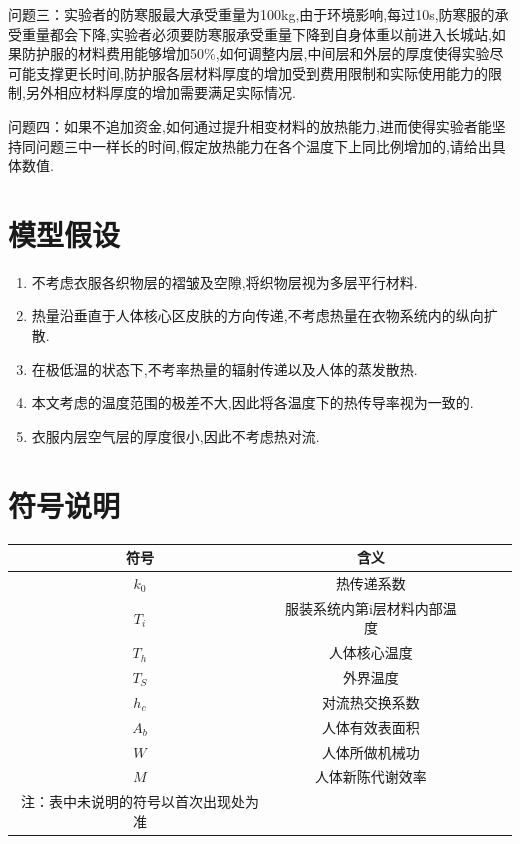 \documentclass{whutmod}
\begin{document}
问题三：实验者的防寒服最大承受重量为100kg,由于环境影响,每过10s,防寒服的承受重量都会下降,实验者必须要防寒服承受重量下降到自身体重以前进入长城站,如果防护服的材料费用能够增加50\%,如何调整内层,中间层和外层的厚度使得实验尽可能支撑更长时间,防护服各层材料厚度的增加受到费用限制和实际使用能力的限制,另外相应材料厚度的增加需要满足实际情况.

问题四：如果不追加资金,如何通过提升相变材料的放热能力,进而使得实验者能坚持同问题三中一样长的时间,假定放热能力在各个温度下上同比例增加的,请给出具体数值.


\section{模型假设}
\begin{enumerate}
	\item 不考虑衣服各织物层的褶皱及空隙,将织物层视为多层平行材料.
	\item 热量沿垂直于人体核心区皮肤的方向传递,不考虑热量在衣物系统内的纵向扩散.
	\item 在极低温的状态下,不考率热量的辐射传递以及人体的蒸发散热.
	\item 本文考虑的温度范围的极差不大,因此将各温度下的热传导率视为一致的.
	\item 衣服内层空气层的厚度很小,因此不考虑热对流.
\end{enumerate}


\section{符号说明}
\begin{center}
	\begin{tabular}{ccccc}
		\toprule[1.5pt]
		符号 & 含义\\
		\midrule[1pt]
		$k_{0}$ & 热传递系数\\
		$T_{i}$ &服装系统内第i层材料内部温度\\
		$T_{h}$ &人体核心温度\\
		$T_{S}$ &外界温度\\
		$h_{c}$ &对流热交换系数\\
		$A_{b}$ &人体有效表面积\\      
		$W$     &人体所做机械功\\
		$M$     &人体新陈代谢效率\\
		\bottomrule[1.5pt]
		注：表中未说明的符号以首次出现处为准
	\end{tabular}
\end{center}
\end{document}
